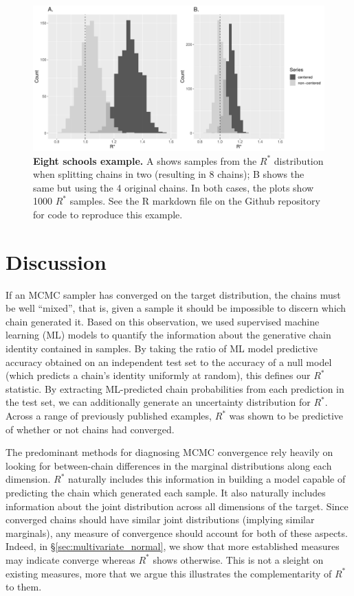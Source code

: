 \documentclass{article}
\begin{document}
\begin{figure}[h]
	\centerline{\includegraphics[width=1.0\textwidth]{../output/eight_schools.pdf}}
	\caption{\textbf{Eight schools example.} A shows samples from the $R^*$ distribution when splitting chains in two (resulting in 8 chains); B shows the same but using the 4 original chains. In both cases, the plots show 1000 $R^*$ samples. See the R markdown file on the Github repository for code to reproduce this example.}
	\label{fig:eight_schools}
\end{figure}

\section{Discussion}
If an MCMC sampler has converged on the target distribution, the chains must be well ``mixed'', that is, given a sample it should be impossible to discern which chain generated it. Based on this observation, we used supervised machine learning (ML) models to quantify the information about the generative chain identity contained in samples. By taking the ratio of ML model predictive accuracy obtained on an independent test set to the accuracy of a null model (which predicts a chain's identity uniformly at random), this defines our $R^*$ statistic. By extracting ML-predicted chain probabilities from each prediction in the test set, we can additionally generate an uncertainty distribution for $R^*$. Across a range of previously published examples, $R^*$ was shown to be predictive of whether or not chains had converged.

The predominant methods for diagnosing MCMC convergence rely heavily on looking for between-chain differences in the marginal distributions along each dimension. $R^*$ naturally includes this information in building a model capable of predicting the chain which generated each sample. It also naturally includes information about the joint distribution across all dimensions of the target. Since converged chains should have similar joint distributions (implying similar marginals), any measure of convergence should account for both of these aspects. Indeed, in \S\ref{sec:multivariate_normal}, we show that more established measures may indicate converge whereas $R^*$ shows otherwise. This is not a sleight on existing measures, more that we argue this illustrates the complementarity of $R^*$ to them.
\end{document}
